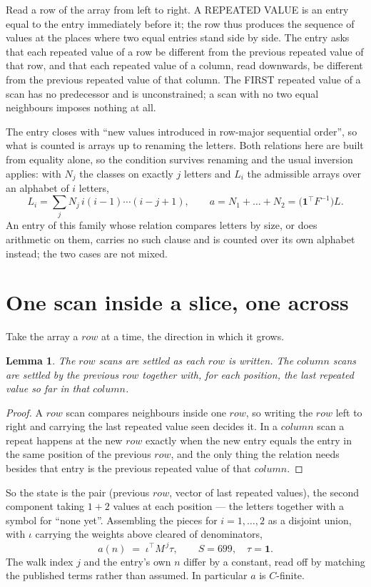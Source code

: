 \documentclass[11pt,a4paper]{article}
\theoremstyle{plain}
\newtheorem{lemma}[theorem]{Lemma}
\theoremstyle{definition}
\begin{document}
Read a row of the array from left to right. A REPEATED VALUE is an entry equal to the entry
immediately before it; the row thus produces the sequence of values at the places where two
equal entries stand side by side. The entry asks that each repeated value of a row be
different from the previous repeated value of that row, and that each repeated value of a column,
read downwards, be different from the previous repeated value of that column. The FIRST repeated
value of a scan has no predecessor and is unconstrained; a scan with no two equal neighbours
imposes nothing at all.

The entry closes with ``new values introduced in row-major sequential order'', so what is
counted is arrays up to renaming the letters. Both relations here are built from equality
alone, so the condition survives renaming and the usual inversion applies: with $N_j$ the
classes on exactly $j$ letters and $L_i$ the admissible arrays over an alphabet of $i$ letters,
\[
L_i=\sum_j N_j\,i(i-1)\cdots(i-j+1),\qquad
a=N_1+\dots+N_{2}=\bigl(\mathbf{1}^{\!\top}F^{-1}\bigr)L .
\]
An entry of this family whose relation compares letters by size, or does arithmetic on them,
carries no such clause and is counted over its own alphabet instead; the two cases are not
mixed.

\section{One scan inside a slice, one across}

Take the array a $row$ at a time, the direction in which it grows.

\begin{lemma}\label{lem:state}
The $row$ scans are settled as each $row$ is written. The $column$ scans are
settled by the previous $row$ together with, for each position, the last repeated value
so far in that $column$.
\end{lemma}

\begin{proof}
A $row$ scan compares neighbours inside one $row$, so writing the
$row$ left to right and carrying the last repeated value seen decides it. In a
$column$ scan a repeat happens at the new $row$ exactly when the new entry equals the
entry in the same position of the previous $row$, and the only thing the relation needs
besides that entry is the previous repeated value of that $column$.
\end{proof}

So the state is the pair (previous $row$, vector of last repeated values), the second
component taking $1+2$ values at each position --- the letters together with a symbol for
``none yet''. Assembling the pieces for $i=1,\dots,2$ as a disjoint union, with $\iota$ carrying the weights above cleared of denominators,
\[
a(n)\;=\;\iota^{\!\top}M^{\,j}\tau ,\qquad S=699,\quad\tau=\mathbf{1} .
\]
The walk index $j$ and the entry's own $n$ differ by a constant, read off by matching the
published terms rather than assumed. In particular $a$ is $C$-finite.
\end{document}
